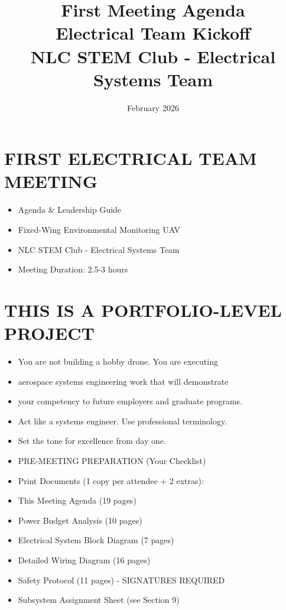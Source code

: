 \documentclass[11pt,letterpaper]{article}
\title{\Huge\textbf{First Meeting Agenda}\\
\Large Electrical Team Kickoff\\
\large NLC STEM Club - Electrical Systems Team}
\author{February 2026}
\date{}
\begin{document}
\maketitle
\thispagestyle{empty}
\newpage
\section{FIRST ELECTRICAL TEAM MEETING}

\begin{itemize}
  \item Agenda \& Leadership Guide
\end{itemize}

\begin{itemize}
  \item Fixed-Wing Environmental Monitoring UAV
  \item NLC STEM Club - Electrical Systems Team
  \item Meeting Duration: 2.5-3 hours
\end{itemize}

\section{THIS IS A PORTFOLIO-LEVEL PROJECT}

\begin{itemize}
  \item You are not building a hobby drone. You are executing
  \item aerospace systems engineering work that will demonstrate
  \item your competency to future employers and graduate programs.
\end{itemize}

\begin{itemize}
  \item Act like a systems engineer. Use professional terminology.
  \item Set the tone for excellence from day one.
\end{itemize}

\begin{itemize}
  \item PRE-MEETING PREPARATION (Your Checklist)
\end{itemize}

\begin{itemize}
  \item Print Documents (1 copy per attendee + 2 extras):
  \item This Meeting Agenda (19 pages)
  \item Power Budget Analysis (10 pages)
  \item Electrical System Block Diagram (7 pages)
  \item Detailed Wiring Diagram (16 pages)
  \item Safety Protocol (11 pages) - SIGNATURES REQUIRED
  \item Subsystem Assignment Sheet (see Section 9)
\end{itemize}
\end{document}
